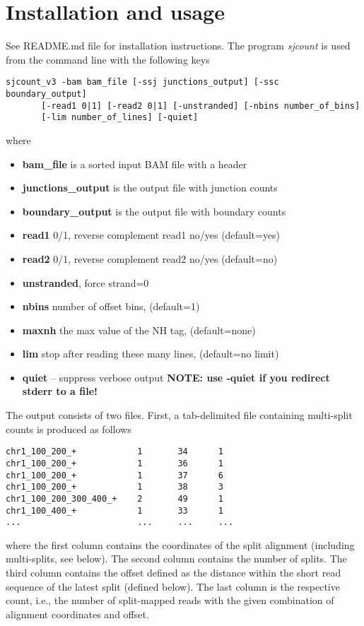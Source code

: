 \documentclass{article}
\begin{document}
\section{Installation and usage}
See README.md file for installation instructions. The program {\em sjcount} is used from the command line with the following keys
\begin{verbatim}
sjcount_v3 -bam bam_file [-ssj junctions_output] [-ssc boundary_output]
       [-read1 0|1] [-read2 0|1] [-unstranded] [-nbins number_of_bins]
       [-lim number_of_lines] [-quiet]
\end{verbatim}
where
\begin{itemize}
\item {\bf bam\_file} is a sorted input BAM file with a header
\item {\bf junctions\_output} is the output file with junction counts
\item {\bf boundary\_output} is the output file with boundary counts
\item {\bf read1} 0/1, reverse complement read1 no/yes (default=yes)
\item {\bf read2} 0/1, reverse complement read2 no/yes (default=no)
\item {\bf unstranded}, force strand=0
\item {\bf nbins} number of offset bins, (default=1)
\item {\bf maxnh} the max value of the NH tag, (default=none)
\item {\bf lim} stop after reading these many lines, (default=no limit)
\item {\bf quiet} -- suppress verbose output {\bf NOTE: use -quiet if you redirect stderr to a file!}
\end{itemize}

The output consists of two files. First, a tab-delimited file containing multi-split counts is produced as follows
\begin{verbatim}
chr1_100_200_+            1       34      1
chr1_100_200_+            1       36      1
chr1_100_200_+            1       37      6
chr1_100_200_+            1       38      3
chr1_100_200_300_400_+    2       49      1
chr1_100_400_+            1       33      1
...                       ...     ...     ...
\end{verbatim}
where the first column contains the coordinates of the split alignment (including multi-splits, see below). The second 
column contains the number of splits. The third column contains the offset defined as the distance within the short read 
sequence of the latest split (defined below). The last column is the respective count, i.e., the number of split-mapped 
reads with the given combination of alignment coordinates and offset. 
\end{document}
